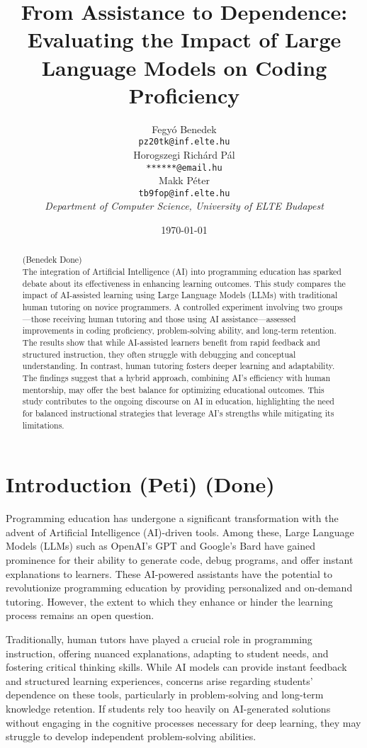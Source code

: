\documentclass[12pt]{article}  %
\title{From Assistance to Dependence: Evaluating the Impact of Large Language Models on Coding Proficiency}  %
\author{
  Fegyó Benedek\\
  \texttt{pz20tk@inf.elte.hu} \\[1ex]
  Horogszegi Richárd Pál\\
  \texttt{******@email.hu} \\[1ex]
  Makk Péter\\
  \texttt{tb9fop@inf.elte.hu} \\[2ex]
  \textit{Department of Computer Science, University of ELTE Budapest}  %
}
\date{\today}  %
\begin{document}
\maketitle

\begin{abstract}
    (Benedek Done)\\
    The integration of Artificial Intelligence (AI) into programming education has sparked debate about its effectiveness in enhancing learning outcomes. This study compares the impact of AI-assisted learning using Large Language Models (LLMs) with traditional human tutoring on novice programmers. A controlled experiment involving two groups—those receiving human tutoring and those using AI assistance—assessed improvements in coding proficiency, problem-solving ability, and long-term retention. The results show that while AI-assisted learners benefit from rapid feedback and structured instruction, they often struggle with debugging and conceptual understanding. In contrast, human tutoring fosters deeper learning and adaptability. The findings suggest that a hybrid approach, combining AI's efficiency with human mentorship, may offer the best balance for optimizing educational outcomes. This study contributes to the ongoing discourse on AI in education, highlighting the need for balanced instructional strategies that leverage AI's strengths while mitigating its limitations.
\end{abstract}

\section{Introduction (Peti) (Done)}
\label{sec:intro}
Programming education has undergone a significant transformation with the advent of Artificial Intelligence (AI)-driven tools. Among these, Large Language Models (LLMs) such as OpenAI's GPT and Google's Bard have gained prominence for their ability to generate code, debug programs, and offer instant explanations to learners. These AI-powered assistants have the potential to revolutionize programming education by providing personalized and on-demand tutoring. However, the extent to which they enhance or hinder the learning process remains an open question.

Traditionally, human tutors have played a crucial role in programming instruction, offering nuanced explanations, adapting to student needs, and fostering critical thinking skills. While AI models can provide instant feedback and structured learning experiences, concerns arise regarding students' dependence on these tools, particularly in problem-solving and long-term knowledge retention. If students rely too heavily on AI-generated solutions without engaging in the cognitive processes necessary for deep learning, they may struggle to develop independent problem-solving abilities.
\end{document}
